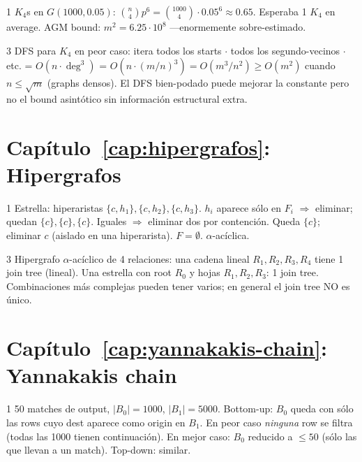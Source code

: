 \begin{solucion}{1}
\(K_4\)s en \(G(1000, 0.05)\): \(\binom{n}{4} p^6 = \binom{1000}{4}
\cdot 0.05^6 \approx 0.65\). Esperaba 1 \(K_4\) en average. AGM
bound: \(m^2 = 6.25 \cdot 10^8\) ---enormemente sobre-estimado.
\end{solucion}

\begin{solucion}{3}
DFS para \(K_4\) en peor caso: itera todos los starts \(\cdot\)
todos los segundo-vecinos \(\cdot\) etc. = \(O(n \cdot \deg^3)\)
= \(O(n \cdot (m/n)^3) = O(m^3 / n^2) \geq O(m^2)\) cuando
\(n \leq \sqrt{m}\) (graphs densos). El DFS bien-podado puede
mejorar la constante pero no el bound asintótico sin información
estructural extra.
\end{solucion}

\section*{Capítulo~\ref{cap:hipergrafos}: Hipergrafos}

\begin{solucion}{1}
Estrella: hiperaristas \(\{c, h_1\}, \{c, h_2\}, \{c, h_3\}\).
\(h_i\) aparece sólo en \(F_i\) $\Rightarrow$ eliminar; quedan
\(\{c\}, \{c\}, \{c\}\). Iguales $\Rightarrow$ eliminar dos por
contención. Queda \(\{c\}\); eliminar \(c\) (aislado en una
hiperarista). \(F = \emptyset\). \(\alpha\)-acíclica.
\end{solucion}

\begin{solucion}{3}
Hipergrafo \(\alpha\)-acíclico de 4 relaciones: una cadena lineal
\(R_1, R_2, R_3, R_4\) tiene 1 join tree (lineal). Una estrella
con root \(R_0\) y hojas \(R_1, R_2, R_3\): 1 join tree.
Combinaciones más complejas pueden tener varios; en general el
join tree NO es único.
\end{solucion}

\section*{Capítulo~\ref{cap:yannakakis-chain}: Yannakakis chain}

\begin{solucion}{1}
50 matches de output, \(|B_0| = 1000\), \(|B_1| = 5000\). Bottom-up:
\(B_0\) queda con sólo las rows cuyo dest aparece como origin en
\(B_1\). En peor caso \emph{ninguna} row se filtra (todas las
1000 tienen continuación). En mejor caso: \(B_0\) reducido a
\(\leq 50\) (sólo las que llevan a un match). Top-down: similar.
\end{solucion}

